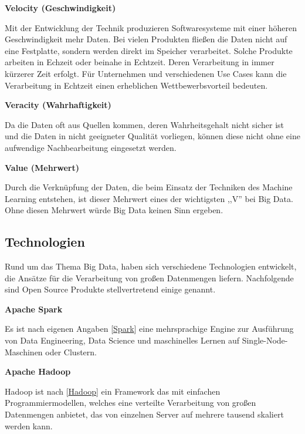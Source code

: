 \textbf{Velocity (Geschwindigkeit)}\vspace{0.2cm}

Mit der Entwicklung der Technik produzieren Softwaresysteme mit einer höheren Geschwindigkeit mehr Daten. Bei vielen Produkten fließen die Daten nicht auf eine Festplatte, sondern werden direkt im Speicher verarbeitet. Solche Produkte arbeiten in Echzeit oder beinahe in Echtzeit. Deren Verarbeitung in immer kürzerer Zeit erfolgt. Für Unternehmen und verschiedenen Use Cases kann die Verarbeitung in Echtzeit einen erheblichen Wettbewerbsvorteil bedeuten.\vspace{0.5cm}

\textbf{Veracity (Wahrhaftigkeit)}\vspace{0.2cm}

Da die Daten oft aus Quellen kommen, deren Wahrheitsgehalt nicht sicher ist und die Daten in nicht geeigneter Qualität vorliegen, können diese nicht ohne eine aufwendige Nachbearbeitung eingesetzt werden.\vspace{0.5cm}

\textbf{Value (Mehrwert)}\vspace{0.2cm}

Durch die Verknüpfung der Daten, die beim Einsatz der Techniken des Machine Learning entstehen, ist dieser Mehrwert eines der wichtigsten ,,V'' bei Big Data. Ohne diesen Mehrwert würde Big Data keinen Sinn ergeben.

\subsection{Technologien}
Rund um das Thema Big Data, haben sich verschiedene Technologien entwickelt, die Ansätze für die Verarbeitung von großen Datenmengen liefern. Nachfolgende sind Open Source Produkte stellvertretend einige genannt.\vspace{0.2cm}

\textbf{Apache Spark}\vspace{0.2cm}

Es ist nach eigenen Angaben [\href{https://spark.apache.org}{Spark}] eine mehrsprachige Engine zur Ausführung von Data Engineering, Data Science und maschinelles Lernen auf Single-Node-Maschinen oder Clustern.\vspace{0.5cm}

\textbf{Apache Hadoop}\vspace{0.2cm}

Hadoop ist nach [\href{https://hadoop.apache.org}{Hadoop}] ein Framework das mit einfachen Programmiermodellen, welches eine verteilte Verarbeitung von großen Datenmengen anbietet, das von einzelnen Server auf mehrere tausend skaliert werden kann.\vspace{0.5cm}

